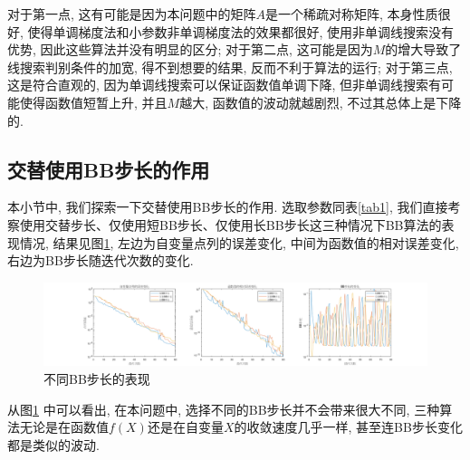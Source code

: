 \documentclass[UTF8]{ctexart}
\begin{document}
对于第一点, 这有可能是因为本问题中的矩阵$A$是一个稀疏对称矩阵, 本身性质很好, 使得单调梯度法和小参数非单调梯度法的效果都很好, 使用非单调线搜索没有优势, 因此这些算法并没有明显的区分; 对于第二点, 这可能是因为$M$的增大导致了线搜索判别条件的加宽, 得不到想要的结果, 反而不利于算法的运行; 对于第三点, 这是符合直观的, 因为单调线搜索可以保证函数值单调下降, 但非单调线搜索有可能使得函数值短暂上升, 并且$M$越大, 函数值的波动就越剧烈, 不过其总体上是下降的. 

\subsection{交替使用BB步长的作用}
本小节中, 我们探索一下交替使用BB步长的作用. 选取参数同表\ref{tab1}, 我们直接考察使用交替步长、仅使用短BB步长、仅使用长BB步长这三种情况下BB算法的表现情况, 结果见图\ref{fig7}, 左边为自变量点列的误差变化, 中间为函数值的相对误差变化, 右边为BB步长随迭代次数的变化. 

\begin{figure}[htb]
    \centering
    \includegraphics[width=\textwidth]{Q2-figure/7.png}
    \caption{不同BB步长的表现}\label{fig7}
\end{figure}

从图\ref{fig7} 中可以看出, 在本问题中, 选择不同的BB步长并不会带来很大不同, 三种算法无论是在函数值$f(X)$还是在自变量$X$的收敛速度几乎一样, 甚至连BB步长变化都是类似的波动. 
\end{document}
